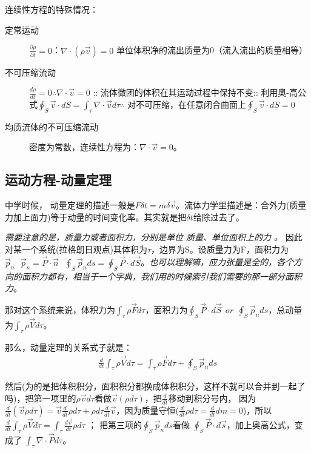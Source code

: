 \documentclass[UTF8,12pt]{article}
\begin{document}
连续性方程的特殊情况：
\begin{description}
    \item[定常运动] $\frac{\partial \rho}{\partial t} = 0$：$\nabla \cdot (\rho \vec v) = 0$ 单位体积净的流出质量为0（流入流出的质量相等）
    \item[不可压缩流动] $\frac{d\rho}{dt} = 0 \therefore \nabla \cdot \vec v = 0$ ::
     流体微团的体积在其运动过程中保持不变::
     利用奥-高公式$\oint_S \vec v \cdot dS = \int_{\tau} \nabla \cdot \vec v d \tau \therefore$
     对不可压缩，在任意闭合曲面上$\oint_S \vec v \cdot dS = 0$
    \item[均质流体的不可压缩流动] 密度为常数，连续性方程为：$\nabla \cdot \vec v = 0$。
\end{description}
\subsection{运动方程-动量定理}

中学时候，
动量定理的描述一般是$F\delta t = m \delta \vec v$。流体力学里描述是：合外力(质量力加上面力)等于动量的时间变化率。其实就是把$\delta t$给除过去了。

\emph{需要注意的是，质量力或者面积力，分别是单位
质量、单位面积上的力
。}
因此对某一个系统(拉格朗日观点)其体积为$\tau$，边界为S。设质量力为F，面积力为$\vec p_n~~~ \vec p_n = \vec P \cdot \vec n ~~~ \oint _S \vec p_n ds  = \oint _S \vec P \cdot d\vec S $。\emph{也可以理解嘛，应力张量是全的，各个方向的面积力都有，相当于一个字典，我们用的时候索引我们需要的那一部分面积力}。

那对这个系统来说，体积力为$\int _{\tau} \rho \vec F d\tau $，面积力为$\oint _S \vec P \cdot d\vec S ~~or~~ \oint_S \vec p_n ds $，总动量为$\int_{\tau} \rho \vec V d\tau$。

那么，动量定理的关系式子就是：
\begin{align*}
    \frac{d}{dt} \int_{\tau} \rho \vec V d\tau 
     = \int_{\tau} \rho \vec F d\tau 
     + \oint_S \vec p_n ds
\end{align*}

然后(为的是把体积积分，面积积分都换成体积积分，这样不就可以合并到一起了吗)，把第一项里的$\rho \vec v d\tau $看做$\vec v(\rho  d\tau)$，把$\frac{d}{dt}$移动到积分号内，
因为$\frac{d}{dt}(\vec v \rho d\tau) = 
\vec v  \frac{d}{dt} \rho d\tau 
+ \rho d\tau \frac{d}{dt} \vec v
$，因为质量守恒($\frac{d}{dt} \rho d\tau = 
\frac{d}{dt} dm = 0$)，所以$\frac{d}{dt} \int_{\tau} \rho \vec V d\tau = \int_{\tau} \frac{d\vec v}{dt}
\rho d\tau$
；
把第三项的$\oint_S \vec p_n ds$看做
$\oint_S \vec P \cdot d\vec s$，加上奥高公式，变成了
$\int_{\tau} \nabla \cdot \vec P d\tau$。
\end{document}
